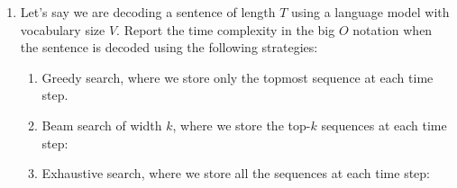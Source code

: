 \documentclass[11pt, letterpaper]{article}
\begin{document}
\begin{enumerate}
\begin{enumerate}
        
    \end{enumerate}

    \item Let's say we are decoding a sentence of length $T$ using a language model with vocabulary size $V$. Report the time complexity in the big $O$ notation when the sentence is decoded using the following strategies:

    \begin{enumerate}
    \item Greedy search, where we store only the topmost sequence at each time step. 
    

    
    \item Beam search of width $k$, where we store the top-$k$ sequences at each time step: 


    
    \item Exhaustive search, where we store all the sequences at each time step: 
    
    
    \end{enumerate}

\end{enumerate}
\end{document}
